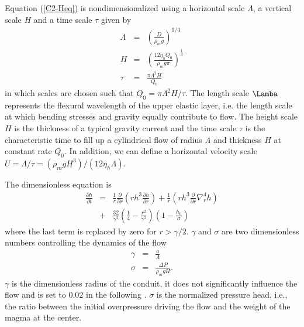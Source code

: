 Equation (\ref{C2-Heq}) is nondimensionalized using a horizontal scale
$\Lambda$, a vertical scale $H$ and a time scale $\tau$ given by
\begin{eqnarray}
  \Lambda &=& \left(\frac{D}{\rho_m g}\right)^{1/4}\label{C2-L1}\\
  H&=&\left       (\frac{12\eta_h      Q_{0}}{\rho_{m}g       \pi}\right      )
       ^{\frac{1}{4}} \label{C2-H1}\\
  \tau&=&\frac{\pi \Lambda^{2} H}{Q_{0}}\label{C2-T1}
\end{eqnarray}
in which scales are chosen such  that $Q_0 = \pi\Lambda^2 H/\tau$. The
length scale $\Lamba$ represents the  flexural wavelength of the upper
elastic layer,  i.e. the  length scale at  which bending  stresses and
gravity  equally contribute  to flow.   The  height scale  $H$ is  the
thickness of  a typical gravity current  and the time scale  $\tau$ is
the  characteristic time  to  fill  up a  cylindrical  flow of  radius
$\Lambda$ and thickness  $H$ at constant rate $Q_0$.   In addition, we
can       define        a       horizontal        velocity       scale
$U=\Lambda/\tau=\left(\rho_m           g           H^3\right)/\left(12
  \eta_h\Lambda\right)$.

The dimensionless equation is
\begin{eqnarray}
  \frac{\partial h}{\partial t}& =&\frac{1}{ r}
                                    \frac{\partial}{\partial r}  \left( rh^3  \frac{\partial h}{\partial
                                    r}\right)+\frac{1}{ r} \left( rh^3
                                    \frac{\partial}{\partial
                                    r}\nabla_r^4h\right)\nonumber\\
                               &+&
                                   \frac{32}{\gamma^{2}}\left(\frac{1}{4}-\frac{r^{2}}{\gamma^{2}}\right)\left(1-\frac{h_0}{\sigma}\right)
                                   \label{C2-mainEq}
\end{eqnarray}
where the last term is replaced by zero for $r>\gamma/2$. $\gamma$ and
$\sigma$ are two dimensionless numbers controlling the dynamics of the
flow
\begin{eqnarray}
  \gamma &=& \frac{a}{\Lambda}\\
  \sigma &=& \frac{\Delta P}{\rho_m g H}.
\end{eqnarray}
$\gamma$  is the  dimensionless radius  of  the conduit,  it does  not
significantly influence the flow and is set to $0.02$ in the following
\citep{Michaut:2009jx,Michaut:2011kg}.   $\sigma$  is  the  normalized
pressure  head,  i.e.,  the  ratio between  the  initial  overpressure
driving the flow and the weight of the magma at the center.
	 
